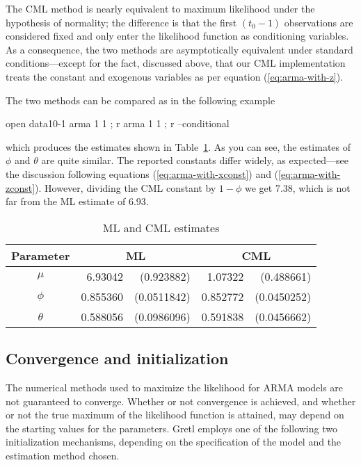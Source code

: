 The CML method is nearly equivalent to maximum likelihood under the
hypothesis of normality; the difference is that the first $(t_0 - 1)$
observations are considered fixed and only enter the likelihood
function as conditioning variables. As a consequence, the two methods
are asymptotically equivalent under standard conditions---except for
the fact, discussed above, that our CML implementation treats the
constant and exogenous variables as per equation (\ref{eq:arma-with-z}).

The two methods can be compared as in the following example
\begin{code}
open data10-1
arma 1 1 ; r
arma 1 1 ; r --conditional
\end{code}
which produces the estimates shown in Table~\ref{tab:ml-cml}.  As you
can see, the estimates of $\phi$ and $\theta$ are quite similar.  The
reported constants differ widely, as expected---see the discussion
following equations (\ref{eq:arma-with-xconst}) and
(\ref{eq:arma-with-zconst}).  However, dividing the CML constant by
$1-\phi$ we get 7.38, which is not far from the ML estimate of 6.93.

\begin{table}[htbp]
\caption{ML and CML estimates}
\label{tab:ml-cml}
\begin{center}
  \begin{tabular}{crrrr}
    \hline
    Parameter & \multicolumn{2}{c}{ML} &
    \multicolumn{2}{c}{CML} \\
    \hline 
    $\mu$ & 6.93042 & (0.923882) & 1.07322 & (0.488661) \\
    $\phi$ & 0.855360 & (0.0511842) & 0.852772 & (0.0450252) \\
    $\theta$ & 0.588056 & (0.0986096) & 0.591838 & (0.0456662) \\
    \hline
  \end{tabular}
\end{center}
\end{table}

\subsection{Convergence and initialization}

The numerical methods used to maximize the likelihood for ARMA models
are not guaranteed to converge.  Whether or not convergence is
achieved, and whether or not the true maximum of the likelihood
function is attained, may depend on the starting values for the
parameters.  Gretl employs one of the following two
initialization mechanisms, depending on the specification of the model
and the estimation method chosen.

